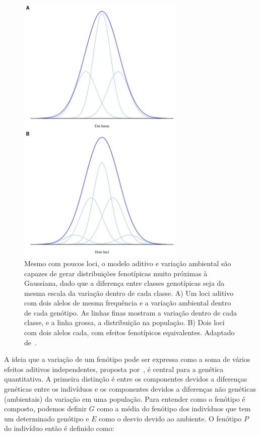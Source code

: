 \begin{refsection}
\begin{figure}
    \centering
    \includegraphics[width=300px]{discrete_gaussian.png}
    \caption[Variação contínua]{Mesmo com poucos loci, o modelo aditivo e variação ambiental são capazes de gerar distribuições fenotípicas muito próximas à Gaussiana, dado que a diferença entre classes genotípicas seja da mesma escala da variação dentro de cada classe. A) Um loci aditivo com dois alelos de mesma frequência e a variação ambiental dentro de cada genótipo. As linhas finas mostram a variação dentro de cada classe, e a linha grossa, a distribuição na população. B) Dois loci com dois alelos cada, com efeitos fenotípicos equivalentes. Adaptado de~\textcite{Barton2007-hq}.}
    \label{discrete_aleles}
\end{figure}

A ideia que a variação de um fenótipo pode ser expressa como a soma de vários
efeitos aditivos independentes, proposta por~\textcite{Fisher1930-bp}, é
central para a genética quantitativa. A primeira distinção é entre os
componentes devidos a diferenças genéticas entre os indivíduos e os componentes
devidos a diferenças não genéticas (ambientais) da variação em uma população.
Para entender como o fenótipo é composto, podemos definir $G$ como a média do
fenótipo dos indivíduos que tem um determinado genótipo e $E$ como o desvio
devido ao ambiente. O fenótipo $P$ do indivíduo então é definido como:


\end{refsection}
